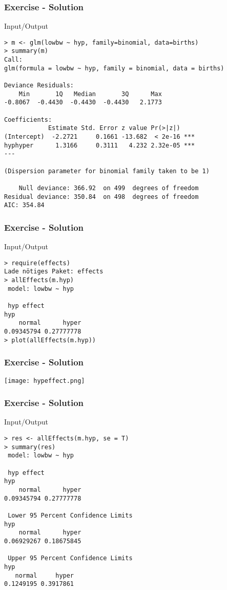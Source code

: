 \begin{frame}[fragile]\frametitle{Exercise - Solution}\footnotesize
\begin{exampleblock}{Input/Output}\scriptsize
\begin{verbatim}
> m <- glm(lowbw ~ hyp, family=binomial, data=births)
> summary(m)
Call:
glm(formula = lowbw ~ hyp, family = binomial, data = births)

Deviance Residuals: 
    Min       1Q   Median       3Q      Max  
-0.8067  -0.4430  -0.4430  -0.4430   2.1773  

Coefficients:
            Estimate Std. Error z value Pr(>|z|)    
(Intercept)  -2.2721     0.1661 -13.682  < 2e-16 ***
hyphyper      1.3166     0.3111   4.232 2.32e-05 ***
---

(Dispersion parameter for binomial family taken to be 1)

    Null deviance: 366.92  on 499  degrees of freedom
Residual deviance: 350.84  on 498  degrees of freedom
AIC: 354.84

\end{verbatim}
\end{exampleblock}
\end{frame}



\begin{frame}[fragile]\frametitle{Exercise - Solution}\footnotesize
\begin{exampleblock}{Input/Output}\small
\begin{verbatim}
> require(effects)
Lade nötiges Paket: effects
> allEffects(m.hyp)
 model: lowbw ~ hyp

 hyp effect
hyp
    normal      hyper 
0.09345794 0.27777778 
> plot(allEffects(m.hyp))
\end{verbatim}
\end{exampleblock}
\end{frame}



\begin{frame}[fragile]\frametitle{Exercise - Solution}\footnotesize
  \begin{center}
    \texttt{[image: hypeffect.png]}
  \end{center}

\end{frame}

\begin{frame}[fragile]\frametitle{Exercise - Solution}\footnotesize
\begin{exampleblock}{Input/Output}\scriptsize
\begin{verbatim}
> res <- allEffects(m.hyp, se = T)
> summary(res)
 model: lowbw ~ hyp

 hyp effect
hyp
    normal      hyper 
0.09345794 0.27777778 

 Lower 95 Percent Confidence Limits
hyp
    normal      hyper 
0.06929267 0.18675845 

 Upper 95 Percent Confidence Limits
hyp
   normal     hyper 
0.1249195 0.3917861 
\end{verbatim}
\end{exampleblock}
\end{frame}

